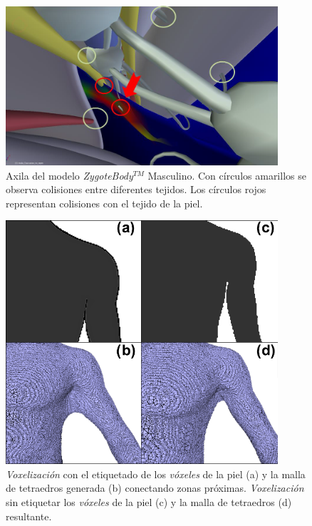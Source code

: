%
\begin{figure}[h]
   \centering
    \includegraphics[width=0.9\textwidth]{IMG/zygoteproblems.png}
    \caption{Axila del modelo \emph{ZygoteBody}$^{TM}$ Masculino. Con círculos amarillos se observa colisiones entre diferentes tejidos. Los círculos rojos representan colisiones con el tejido de la piel.}
   \label{fig:zygoteproblems}
\end{figure}
%

\begin{figure}[h]
  \centering
    \includegraphics[width=0.9\textwidth]{IMG/volumetrizacion4.png}
    \caption{
    \emph{Voxelización} con el etiquetado de los \emph{vóxeles} de la piel (a) y la malla de tetraedros generada (b) conectando zonas próximas. \emph{Voxelización} sin etiquetar los \emph{vóxeles} de la piel (c) y la malla de tetraedros (d) resultante.
    \label{fig:volsol}
    }

\end{figure}




